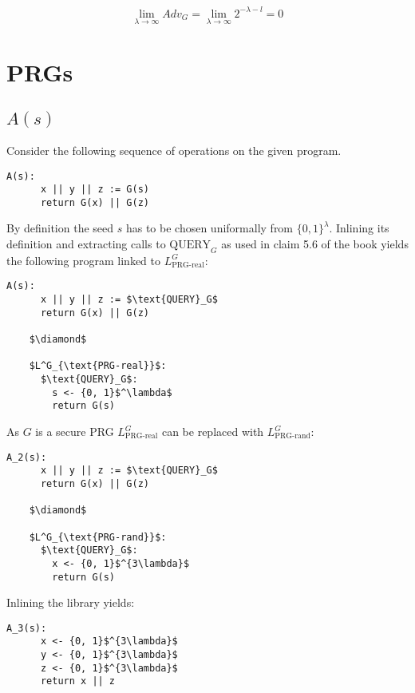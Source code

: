 \documentclass[a4paper]{scrreprt}
\begin{document}
\[
	\lim_{\lambda \rightarrow \infty}{Adv_G} = \lim_{\lambda \rightarrow \infty}{2^{-\lambda -l}} = 0
\]


\section{PRGs}

\subsection{$A(s)$}

Consider the following sequence of operations on the given program.

\begin{lstlisting}[mathescape=true, frame=single]
	A(s):
	  x || y || z := G(s)
	  return G(x) || G(z)
\end{lstlisting}

By definition the seed $s$ has to be chosen uniformally from $\{0,
1\}^\lambda$. Inlining its definition and extracting calls to $\text{QUERY}_G$
as used in claim 5.6 of the book yields the following program linked to
$L^G_{\text{PRG-real}}$:

\begin{lstlisting}[mathescape=true, frame=single]
	A(s):
	  x || y || z := $\text{QUERY}_G$
	  return G(x) || G(z)

	$\diamond$

	$L^G_{\text{PRG-real}}$:
	  $\text{QUERY}_G$:
	    s <- {0, 1}$^\lambda$
	    return G(s)
\end{lstlisting}

As $G$ is a secure PRG $L^G_{\text{PRG-real}}$ can be replaced with $L^G_{\text{PRG-rand}}$:

\begin{lstlisting}[mathescape=true, frame=single]
	A_2(s):
	  x || y || z := $\text{QUERY}_G$
	  return G(x) || G(z)

	$\diamond$

	$L^G_{\text{PRG-rand}}$:
	  $\text{QUERY}_G$:
	    x <- {0, 1}$^{3\lambda}$
	    return G(s)
\end{lstlisting}

Inlining the library yields:

\begin{lstlisting}[mathescape=true, frame=single]
	A_3(s):
	  x <- {0, 1}$^{3\lambda}$
	  y <- {0, 1}$^{3\lambda}$
	  z <- {0, 1}$^{3\lambda}$
	  return x || z
\end{lstlisting}
\end{document}
